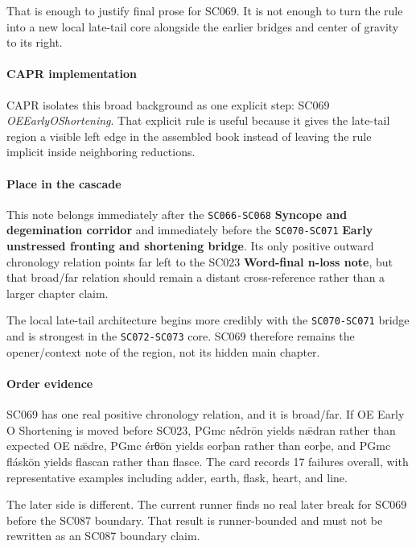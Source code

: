 \documentclass[
  british,
  a4paper,
]{article}
\begin{document}
That is enough to justify final prose for SC069. It is not enough to
turn the rule into a new local late-tail core alongside the earlier
bridges and center of gravity to its right.

\paragraph{CAPR implementation}\label{capr-implementation-43}

CAPR isolates this broad background as one explicit step: SC069
\emph{OEEarlyOShortening}. That explicit rule is useful because it gives
the late-tail region a visible left edge in the assembled book instead
of leaving the rule implicit inside neighboring reductions.

\paragraph{Place in the cascade}\label{place-in-the-cascade-43}

This note belongs immediately after the \texttt{SC066-SC068}
\textbf{Syncope and degemination corridor} and immediately before the
\texttt{SC070-SC071} \textbf{Early unstressed fronting and shortening
bridge}. Its only positive outward chronology relation points far left
to the SC023 \textbf{Word-final n-loss note}, but that broad/far
relation should remain a distant cross-reference rather than a larger
chapter claim.

The local late-tail architecture begins more credibly with the
\texttt{SC070-SC071} bridge and is strongest in the \texttt{SC072-SC073}
core. SC069 therefore remains the opener/context note of the region, not
its hidden main chapter.

\paragraph{Order evidence}\label{order-evidence-43}

SC069 has one real positive chronology relation, and it is broad/far. If
OE Early O Shortening is moved before SC023, PGmc nḗdrōn yields nǣdran
rather than expected OE nǣdre, PGmc érθōn yields eorþan rather than
eorþe, and PGmc fláskōn yields flascan rather than flasce. The card
records 17 failures overall, with representative examples including
adder, earth, flask, heart, and line.

The later side is different. The current runner finds no real later
break for SC069 before the SC087 boundary. That result is runner-bounded
and must not be rewritten as an SC087 boundary claim.
\end{document}

